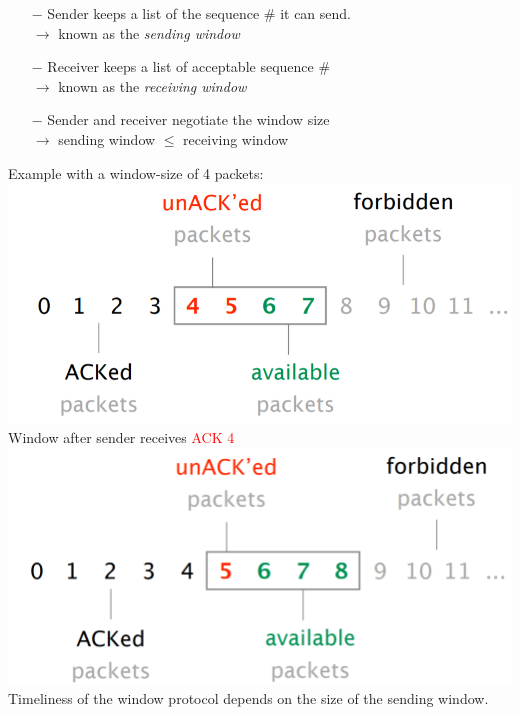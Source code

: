 \documentclass[a4paper, fontsize=8pt, landscape, DIV=1]{scrartcl}
\begin{document}
\begin{multicols*}{4}
    		\begin{itemize}
    			\item[$-$] Sender keeps a list of the sequence \# it can send.\\
	   			$\rightarrow$ known as the \textit{sending window}
	   			\columnbreak
	   			\item[$-$] Receiver keeps a list of acceptable sequence \#\\
	   			$\rightarrow$ known as the \textit{receiving window }
	   			\item[$-$] Sender and receiver negotiate the window size\\
	   			$\rightarrow$ sending window $\le$ receiving window
    		\end{itemize} 
    		Example with a window-size of 4 packets:
    		\includegraphics[width=\columnwidth]{images/Concepts/windowsize4_1.png} 
    		Window after sender receives \textcolor{Red}{ACK 4 }
    		\includegraphics[width=\columnwidth]{images/Concepts/windowsize4_2.png} 
    		Timeliness of the window protocol depends on the size of the sending window.\par
    		

\end{multicols*}
\end{document}
